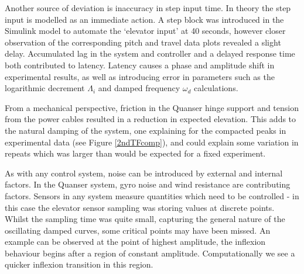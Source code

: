 Another source of deviation is inaccuracy in step input time. In theory
the step input is modelled as an immediate action. A step block was
introduced in the Simulink model to automate the `elevator input' at 40
seconds, however closer observation of the corresponding pitch and
travel data plots revealed a slight delay. Accumulated lag in the system
and controller and a delayed response time both contributed to latency.
Latency causes a phase and amplitude shift in experimental results, as
well as introducing error in parameters such as the logarithmic
decrement \(\Lambda_i\) and damped frequency \(\omega_d\) calculations.

From a mechanical perspective, friction in the Quanser hinge support and
tension from the power cables resulted in a reduction in expected
elevation. This adds to the natural damping of the system, one
explaining for the compacted peaks in experimental data (see Figure
\ref{2ndTFcomp}), and could explain some variation in repeats which was
larger than would be expected for a fixed experiment.

As with any control system, noise can be introduced by external and
internal factors. In the Quanser system, gyro noise and wind resistance
are contributing factors. Sensors in any system measure quantities which
need to be controlled - in this case the elevator sensor sampling was
storing values at discrete points. Whilst the sampling time was quite
small, capturing the general nature of the oscillating damped curves,
some critical points may have been missed. An example can be observed at
the point of highest amplitude, the inflexion behaviour begins after a
region of constant amplitude. Computationally we see a quicker inflexion
transition in this region.

\newpage
